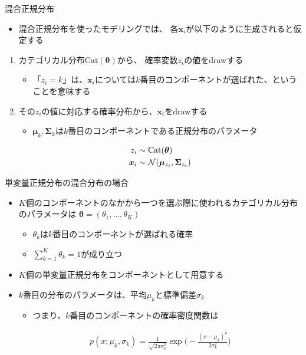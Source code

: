 \documentclass[aspectratio=169,unicode,dvipdfmx,14pt]{beamer}
\begin{document}
\begin{frame}{混合正規分布}
\begin{itemize}
\item 混合正規分布を使ったモデリングでは、
各$\bm{x}_i$が以下のように生成されると仮定する
\end{itemize}
\vspace{.1in}
\begin{enumerate}
\item カテゴリカル分布$\mbox{Cat}(\bm{\theta})$から、
確率変数$z_i$の値をdrawする
\begin{itemize}
\item 「$z_i = k$」は、$\bm{x}_i$については$k$番目のコンポーネントが選ばれた、ということを意味する
\end{itemize}
\item その$z_i$の値に対応する確率分布から、$\bm{x}_i$をdrawする
\begin{itemize}
\item $\bm{\mu}_k, \bm{\Sigma}_k$は$k$番目のコンポーネントである正規分布のパラメータ
\end{itemize}
\begin{align}
z_i & \sim \mbox{Cat}(\bm{\theta}) \notag \\
\bm{x}_i & \sim \mathcal{N}(\bm{\mu}_{z_i}, \bm{\Sigma}_{z_i})
\end{align}
\end{enumerate}
\end{frame}

\begin{frame}{単変量正規分布の混合分布の場合}
\begin{itemize}
\item $K$個のコンポーネントのなかから一つを選ぶ際に使われるカテゴリカル分布のパラメータは
$\bm{\theta} = (\theta_1,\ldots,\theta_K)$
\begin{itemize}
\item $\theta_k$は$k$番目のコンポーネントが選ばれる確率
\item $\sum_{k=1}^K \theta_k = 1$が成り立つ
\end{itemize}
\item $K$個の単変量正規分布をコンポーネントとして用意する
\item $k$番目の分布のパラメータは、平均$\mu_k$と標準偏差$\sigma_k$
\begin{itemize}
\item つまり、$k$番目のコンポーネントの確率密度関数は
\end{itemize}
\begin{align}
p(x;\mu_k,\sigma_k) = \frac{1}{\sqrt{2\pi\sigma_k^2}}\exp\Big( - \frac{(x - \mu_k)^2}{2\sigma_k^2} \Big)
\end{align}
\end{itemize}
\end{frame}
\end{document}
